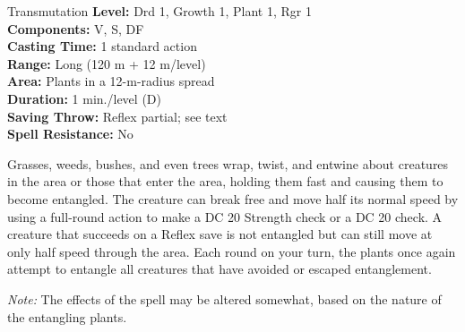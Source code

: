 {Transmutation}
{
	\textbf{Level:}
	Drd 1, Growth 1, Plant 1, Rgr 1\\
	\textbf{Components:}
	V, S, DF\\
	\textbf{Casting Time:}
	1 standard action\\
	\textbf{Range:}
	Long (120 m + 12 m/level)\\
	\textbf{Area:}
	Plants in a 12-m-radius spread\\
	\textbf{Duration:}
	1 min./level (D)\\
	\textbf{Saving Throw:}
	Reflex partial; see text\\
	\textbf{Spell Resistance:}
	No\\
}
{
	Grasses, weeds, bushes, and even trees wrap, twist, and entwine about creatures in the area or those that enter the area, holding them fast and causing them to become entangled. The creature can break free and move half its normal speed by using a full-round action to make a DC 20 Strength check or a DC 20  check. A creature that succeeds on a Reflex save is not entangled but can still move at only half speed through the area. Each round on your turn, the plants once again attempt to entangle all creatures that have avoided or escaped entanglement.

	\textit{Note:} The effects of the spell may be altered somewhat, based on the nature of the entangling plants.

}
